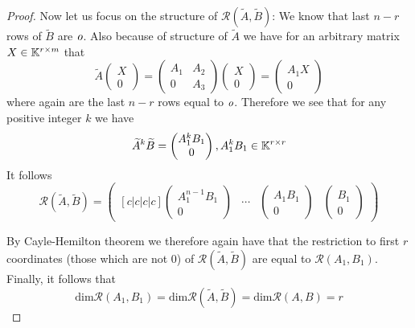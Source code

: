 \begin{proof}
	Now let us focus on the structure of $\mathcal{R}(\widetilde{A},\widetilde{B})$: We know that last $n-r$ rows of $\widetilde{B}$ are $\textit{o}$. Also because of structure of $\widetilde{A}$ we have for an arbitrary matrix $X\in\mathbb{K}^{r\times m}$ that 
	\begin{equation*}
		\widetilde{A}
		\begin{pmatrix}
			X \\
			0
		\end{pmatrix}
		=
		\begin{pmatrix}
			A_1 & A_2 \\
			  0 & A_3
		\end{pmatrix}
		\begin{pmatrix}
			X \\
			0
		\end{pmatrix}
		=
		\begin{pmatrix}
			A_1X \\
			0
		\end{pmatrix}
	\end{equation*}
	where again are the last $n-r$ rows equal to $\textit{o}$. Therefore we see that for any positive integer $k$ we have 
	\begin{equation*}
		\widetilde{A}^k\widetilde{B}=
		\begin{pmatrix}
			A_1^{k}B_1 \\
			0
        \end{pmatrix}
        ,A_1^kB_1\in\mathbb{K}^{r\times r}
    \end{equation*}
    It follows
    \begin{equation*}
        \mathcal{R}(\widetilde{A},\widetilde{B})=
        \begin{pmatrix}[c|c|c|c]
            \begin{pmatrix}
                A_1^{n-1}B_1 \\
                0 
            \end{pmatrix}
            & \cdots &
            \begin{pmatrix}
                A_1B_1 \\
                0 
            \end{pmatrix}
            &
            \begin{pmatrix}
                B_1 \\
                0 
            \end{pmatrix}
        \end{pmatrix}
    \end{equation*}
	
	By Cayle-Hemilton theorem we therefore again have that the restriction to first $r$ coordinates (those which are not 0) of $\mathcal{R}(\widetilde{A},\widetilde{B})$ are equal to $\mathcal{R}(A_1,B_1)$. Finally, it follows that $$\text{dim}\mathcal{R}(A_1,B_1)=\text{dim}\mathcal{R}(\widetilde{A},\widetilde{B})=\text{dim}\mathcal{R}(A,B)=r$$
\end{proof}

